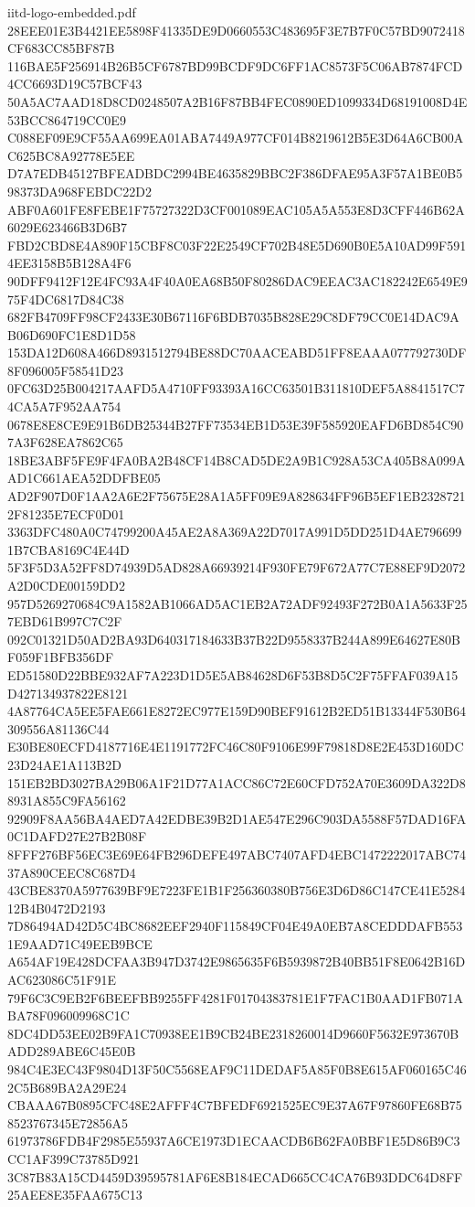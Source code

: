 \begin{filecontents*}[overwrite]{iitd-logo-embedded.pdf}
28EEE01E3B4421EE5898F41335DE9D0660553C483695F3E7B7F0C57BD9072418CF683CC85BF87B
116BAE5F256914B26B5CF6787BD99BCDF9DC6FF1AC8573F5C06AB7874FCD4CC6693D19C57BCF43
50A5AC7AAD18D8CD0248507A2B16F87BB4FEC0890ED1099334D68191008D4E53BCC864719CC0E9
C088EF09E9CF55AA699EA01ABA7449A977CF014B8219612B5E3D64A6CB00AC625BC8A92778E5EE
D7A7EDB45127BFEADBDC2994BE4635829BBC2F386DFAE95A3F57A1BE0B598373DA968FEBDC22D2
ABF0A601FE8FEBE1F75727322D3CF001089EAC105A5A553E8D3CFF446B62A6029E623466B3D6B7
FBD2CBD8E4A890F15CBF8C03F22E2549CF702B48E5D690B0E5A10AD99F5914EE3158B5B128A4F6
90DFF9412F12E4FC93A4F40A0EA68B50F80286DAC9EEAC3AC182242E6549E975F4DC6817D84C38
682FB4709FF98CF2433E30B67116F6BDB7035B828E29C8DF79CC0E14DAC9AB06D690FC1E8D1D58
153DA12D608A466D8931512794BE88DC70AACEABD51FF8EAAA077792730DF8F096005F58541D23
0FC63D25B004217AAFD5A4710FF93393A16CC63501B311810DEF5A8841517C74CA5A7F952AA754
0678E8E8CE9E91B6DB25344B27FF73534EB1D53E39F585920EAFD6BD854C907A3F628EA7862C65
18BE3ABF5FE9F4FA0BA2B48CF14B8CAD5DE2A9B1C928A53CA405B8A099AAD1C661AEA52DDFBE05
AD2F907D0F1AA2A6E2F75675E28A1A5FF09E9A828634FF96B5EF1EB23287212F81235E7ECF0D01
3363DFC480A0C74799200A45AE2A8A369A22D7017A991D5DD251D4AE7966991B7CBA8169C4E44D
5F3F5D3A52FF8D74939D5AD828A66939214F930FE79F672A77C7E88EF9D2072A2D0CDE00159DD2
957D5269270684C9A1582AB1066AD5AC1EB2A72ADF92493F272B0A1A5633F257EBD61B997C7C2F
092C01321D50AD2BA93D640317184633B37B22D9558337B244A899E64627E80BF059F1BFB356DF
ED51580D22BBE932AF7A223D1D5E5AB84628D6F53B8D5C2F75FFAF039A15D427134937822E8121
4A87764CA5EE5FAE661E8272EC977E159D90BEF91612B2ED51B13344F530B64309556A81136C44
E30BE80ECFD4187716E4E1191772FC46C80F9106E99F79818D8E2E453D160DC23D24AE1A113B2D
151EB2BD3027BA29B06A1F21D77A1ACC86C72E60CFD752A70E3609DA322D88931A855C9FA56162
92909F8AA56BA4AED7A42EDBE39B2D1AE547E296C903DA5588F57DAD16FA0C1DAFD27E27B2B08F
8FFF276BF56EC3E69E64FB296DEFE497ABC7407AFD4EBC1472222017ABC7437A890CEEC8C687D4
43CBE8370A5977639BF9E7223FE1B1F256360380B756E3D6D86C147CE41E528412B4B0472D2193
7D86494AD42D5C4BC8682EEF2940F115849CF04E49A0EB7A8CEDDDAFB5531E9AAD71C49EEB9BCE
A654AF19E428DCFAA3B947D3742E9865635F6B5939872B40BB51F8E0642B16DAC623086C51F91E
79F6C3C9EB2F6BEEFBB9255FF4281F01704383781E1F7FAC1B0AAD1FB071ABA78F096009968C1C
8DC4DD53EE02B9FA1C70938EE1B9CB24BE2318260014D9660F5632E973670BADD289ABE6C45E0B
984C4E3EC43F9804D13F50C5568EAF9C11DEDAF5A85F0B8E615AF060165C462C5B689BA2A29E24
CBAAA67B0895CFC48E2AFFF4C7BFEDF6921525EC9E37A67F97860FE68B758523767345E72856A5
61973786FDB4F2985E55937A6CE1973D1ECAACDB6B62FA0BBF1E5D86B9C3CC1AF399C73785D921
3C87B83A15CD4459D39595781AF6E8B184ECAD665CC4CA76B93DDC64D8FF25AEE8E35FAA675C13

\end{filecontents*}
